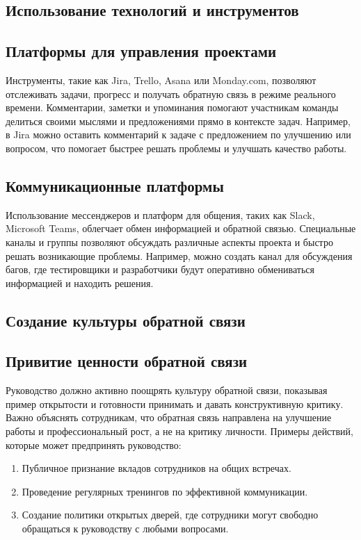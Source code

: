     \subsection*{Использование технологий и инструментов}

    \subsection*{Платформы для управления проектами}
    Инструменты, такие как Jira, Trello, Asana или Monday.com, позволяют отслеживать задачи, прогресс и получать обратную связь в режиме реального времени. Комментарии, заметки и упоминания помогают участникам команды делиться своими мыслями и предложениями прямо в контексте задач. Например, в Jira можно оставить комментарий к задаче с предложением по улучшению или вопросом, что помогает быстрее решать проблемы и улучшать качество работы.

    \subsection*{Коммуникационные платформы}
    Использование мессенджеров и платформ для общения, таких как Slack, Microsoft Teams, облегчает обмен информацией и обратной связью. Специальные каналы и группы позволяют обсуждать различные аспекты проекта и быстро решать возникающие проблемы. Например, можно создать канал для обсуждения багов, где тестировщики и разработчики будут оперативно обмениваться информацией и находить решения.

    \subsection*{Создание культуры обратной связи}

    \subsection*{Привитие ценности обратной связи}
    Руководство должно активно поощрять культуру обратной связи, показывая пример открытости и готовности принимать и давать конструктивную критику. Важно объяснять сотрудникам, что обратная связь направлена на улучшение работы и профессиональный рост, а не на критику личности. Примеры действий, которые может предпринять руководство:
    
    \begin{enumerate}
        \item Публичное признание вкладов сотрудников на общих встречах.
        \item Проведение регулярных тренингов по эффективной коммуникации.
        \item Создание политики открытых дверей, где сотрудники могут свободно обращаться к руководству с любыми вопросами.
    \end{enumerate}
    
